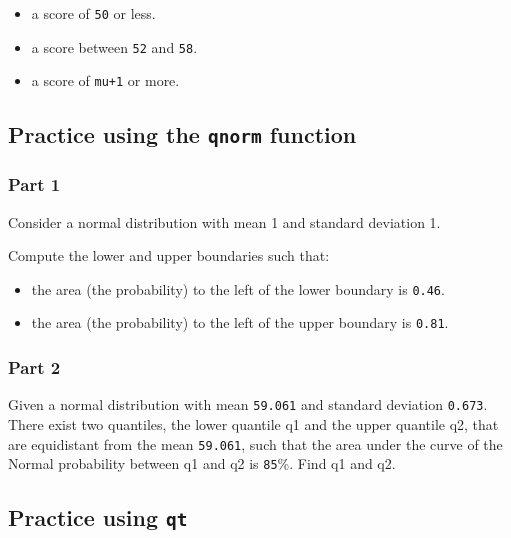 \documentclass[12pt,]{krantz}
\providecommand{\tightlist}{%
  \setlength{\itemsep}{0pt}\setlength{\parskip}{0pt}}
\begin{document}
\begin{itemize}
\tightlist
\item
  a score of \texttt{50} or less.
\item
  a score between \texttt{52} and \texttt{58}.
\item
  a score of \texttt{mu+1} or more.
\end{itemize}

\hypertarget{sec:Foundationsexercisesqnorm}{%
\subsection{\texorpdfstring{Practice using the \texttt{qnorm} function}{Practice using the qnorm function}}\label{sec:Foundationsexercisesqnorm}}

\hypertarget{sec:FoundationsexercisesqnormPart1}{%
\subsubsection{Part 1}\label{sec:FoundationsexercisesqnormPart1}}

Consider a normal distribution with mean 1 and standard deviation 1.

Compute the lower and upper boundaries such that:

\begin{itemize}
\tightlist
\item
  the area (the probability) to the left of the lower boundary is \texttt{0.46}.
\item
  the area (the probability) to the left of the upper boundary is \texttt{0.81}.
\end{itemize}

\hypertarget{sec:FoundationsexercisesqnormPart2}{%
\subsubsection{Part 2}\label{sec:FoundationsexercisesqnormPart2}}

Given a normal distribution with mean \texttt{59.061} and standard deviation \texttt{0.673}. There exist two quantiles, the lower quantile q1 and the upper quantile q2, that are equidistant from the mean \texttt{59.061}, such that the area under the curve of the Normal probability between q1 and q2 is \texttt{85}\%. Find q1 and q2.

\hypertarget{sec:Foundationsexercisesqt}{%
\subsection{\texorpdfstring{Practice using \texttt{qt}}{Practice using qt}}\label{sec:Foundationsexercisesqt}}
\end{document}
